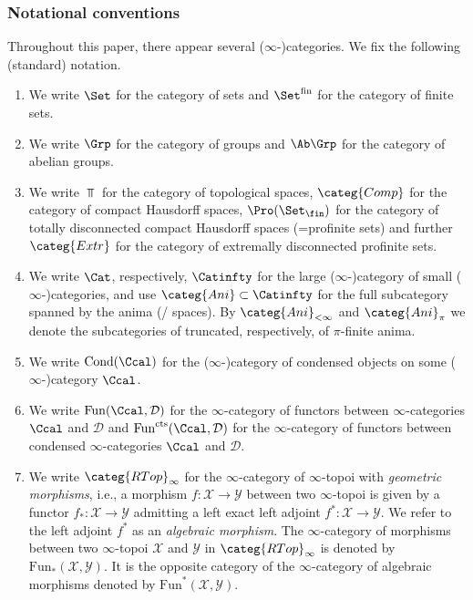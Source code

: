 \documentclass[leqno]{article}
\renewcommand{\Fun}{\mathrm{Fun}}
\renewcommand{\cts}{\mathrm{cts}}
\renewcommand{\Functs}{\Fun^{\cts}}
\newcommand{\Ani}{\categ{Ani}}
\DeclareMathOperator{\Cond}{Cond}
\newcommand{\Comp}{\categ{Comp}}
\DeclareMathOperator{\FinSet}{\Set_{\fin}}
\DeclareMathOperator{\ProFin}{\Pro(\FinSet)}
\newcommand{\Extr}{\categ{Extr}}
\newcommand{\RTop}{\categ{RTop}}
\begin{document}
\subsubsection*{Notational conventions}
%
Throughout this paper, there appear several ($\infty$-)categories. 
We fix the following (standard) notation.
\begin{enumerate}
    \item We write $\Set$ for the category of sets and $\Set^{\mathrm{fin}}$ for the category of finite sets.
    \item We write $\Grp$ for the category of groups and $\Ab\Grp$ for the category of abelian groups.
     \item  We write $\Top$ for the category of topological spaces, $\Comp$ for the category of compact Hausdorff spaces, $\ProFin$ for the category of totally disconnected compact Hausdorff spaces (=profinite sets) and further $\Extr$ for the category of extremally disconnected profinite sets.
	\item We write $\Cat$, respectively, $ \Catinfty $ for the large ($\infty$-)category of small ($\infty$-)categories, and use $ \Ani \subset \Catinfty $ for the full subcategory spanned by the anima (\groupoids/ spaces). By $\Ani_{< \infty}$ and $\Ani_{\pi}$ we denote the subcategories of truncated, respectively, of $\pi$-finite anima.
    \item We write $\Cond(\Ccal)$ for the ($\infty$-)category of condensed objects on some ($\infty$-)category $\Ccal$.
    \item We write $\Fun(\Ccal, \mathcal{D})$ for the $\infty$-category of functors between $\infty$-categories $\Ccal$ and $\mathcal{D}$ and $\Functs(\Ccal, \mathcal{D})$ for the $\infty$-category of functors between condensed $\infty$-categories $\Ccal$ and $\mathcal{D}$.
    \item We write $\RTop_{\infty}$ for the $\infty$-category of $\infty$-topoi with \textit{geometric morphisms}, i.e., a morphism $f\colon \mathcal{X} \rightarrow \mathcal{Y}$ between two $\infty$-topoi is given by a functor $f_*\colon \mathcal{X} \rightarrow \mathcal{Y} $  admitting a left exact left adjoint $f^* \colon \mathcal{X} \rightarrow \mathcal{Y}$. We refer to the left adjoint $f^*$ as an \textit{algebraic morphism}. The $\infty$-category of morphisms between two $\infty$-topoi $\mathcal{X}$ and $\mathcal{Y}$ in $\RTop_{\infty}$ is denoted by $\Fun_*(\mathcal{X},\mathcal{Y})$. It is the opposite category of the $\infty$-category of algebraic morphisms denoted by $\Fun^*(\mathcal{X},\mathcal{Y})$.

\end{enumerate}
\end{document}
